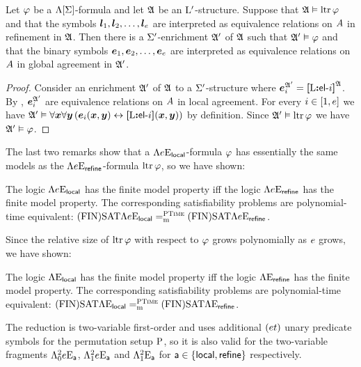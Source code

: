 \begin{remark}
Let $\varphi$ be a $\Lambda[\mathrm{\Sigma}]$-formula and let $\mathfrak{A}$ be an ${{\mathrm{L}}'}$-structure.
Suppose that $\mathfrak{A} \vDash \operatorname{ltr}\varphi$ and that the symbols
$\bm{l}_{1}, \bm{l}_{2}, \dots, \bm{l}_{e}$ are interpreted as equivalence relations on
$A$ in refinement in $\mathfrak{A}$.
Then there is a $\mathrm{\Sigma'}$-enrichment $\mathfrak{A'}$ of $\mathfrak{A}$ such that
$\mathfrak{A'} \vDash \varphi$ and that the binary symbols
$\bm{e}_{1}, \bm{e}_{2}, \dots, \bm{e}_{e}$
are interpreted as equivalence relations on $A$ in global agreement in
$\mathfrak{A'}$.
\end{remark}
\begin{proof}
Consider an enrichment $\mathfrak{A'}$ of $\mathfrak{A}$ to a $\mathrm{\Sigma'}$-structure where
$\bm{e}_{i}^{\mathfrak{A'}} = {\bm{[}{\mathrm{L}}\mathord{\bm{:}}\mathsf{el}{\hbox{-}}i\bm{]}}^{\mathfrak{A}}$.
By , $\bm{e}_{i}^{\mathfrak{A'}}$ are equivalence
relations on $A$ in local agreement. 
For every $i \in [1,e]$ we have
$\mathfrak{A'} \vDash \forall\bm{x}\forall\bm{y} \left(\bm{e}_{i}(\bm{x},\bm{y}) \leftrightarrow
{\bm{[}{\mathrm{L}}\mathord{\bm{:}}\mathsf{el}{\hbox{-}}i\bm{]}}(\bm{x},\bm{y})\right)$ by definition.
Since $\mathfrak{A'} \vDash \operatorname{ltr}\varphi$ we have $\mathfrak{A'} \vDash \varphi$.
\end{proof}

The last two remarks show that a $\Lambda{e}\mathrm{E}_{\mathsf{local}}$-formula $\varphi$
has essentially the same models as the $\Lambda{e}\mathrm{E}_{\mathsf{refine}}$-formula
$\operatorname{ltr}\varphi$, so we have shown:
\begin{proposition}\label{prop:local-to-refine-n}
The logic $\Lambda{e}\mathrm{E}_{\mathsf{local}}$ has the finite model property iff
the logic $\Lambda{e}\mathrm{E}_{\mathsf{refine}}$ has the finite model property.
The corresponding satisfiability problems are polynomial-time equivalent:
$\mathrm{(FIN)SAT}\Lambda{e}\mathrm{E}_{\mathsf{local}} =_{\mathrm{m}}^{\text{\normalfont{\scshape PTime}}} \mathrm{(FIN)SAT}\Lambda{e}\mathrm{E}_{\mathsf{refine}}$.
\end{proposition}

Since the relative size of $\operatorname{ltr}\varphi$ with respect to $\varphi$ grows
polynomially as $e$ grows, we have shown:
\begin{proposition}\label{prop:local-to-refine}
The logic $\Lambda{{}}\mathrm{E}_{\mathsf{local}}$ has the finite model property iff
the logic $\Lambda{{}}\mathrm{E}_{\mathsf{refine}}$ has the finite model property.
The corresponding satisfiability problems are polynomial-time equivalent:
$\mathrm{(FIN)SAT}\Lambda{{}}\mathrm{E}_{\mathsf{local}} =_{\mathrm{m}}^{\text{\normalfont{\scshape PTime}}} \mathrm{(FIN)SAT}\Lambda{{}}\mathrm{E}_{\mathsf{refine}}$.
\end{proposition}

The reduction is two-variable first-order and uses additional $(et)$
unary predicate symbols for the permutation setup ${\mathrm{P}}$, so it is also valid
for the two-variable fragments $\Lambda^{2}_{0}{e}\mathrm{E}_{\mathsf{a}}$, $\Lambda^{2}_{1}{e}\mathrm{E}_{\mathsf{a}}$
and $\Lambda^{2}_{1}{{}}\mathrm{E}_{\mathsf{a}}$ for $\mathsf{a} \in \left\{\mathsf{local}, \mathsf{refine}\right\}$
respectively.